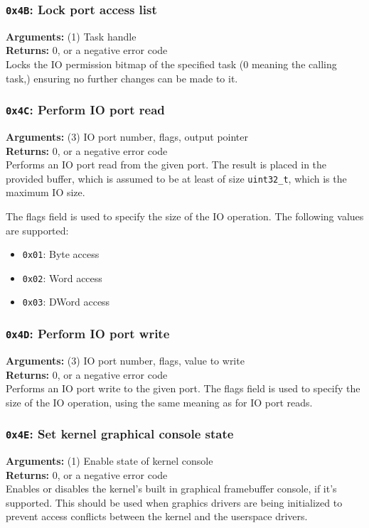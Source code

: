 \documentclass[11pt]{article}
\begin{document}
\subsubsection{{\tt 0x4B}: Lock port access list}
\textbf{Arguments:} (1) Task handle \\
\textbf{Returns:} 0, or a negative error code \\

Locks the IO permission bitmap of the specified task (0 meaning the calling task,) ensuring no further changes can be made to it.

\subsubsection{{\tt 0x4C}: Perform IO port read}
\textbf{Arguments:} (3) IO port number, flags, output pointer \\
\textbf{Returns:} 0, or a negative error code \\

Performs an IO port read from the given port. The result is placed in the provided buffer, which is assumed to be at least of size \texttt{uint32\_t}, which is the maximum IO size.

The flags field is used to specify the size of the IO operation. The following values are supported:
\begin{itemize}
\item \texttt{0x01}: Byte access
\item \texttt{0x02}: Word access
\item \texttt{0x03}: DWord access
\end{itemize}

\subsubsection{{\tt 0x4D}: Perform IO port write}
\textbf{Arguments:} (3) IO port number, flags, value to write \\
\textbf{Returns:} 0, or a negative error code \\

Performs an IO port write to the given port. The flags field is used to specify the size of the IO operation, using the same meaning as for IO port reads.

\subsubsection{{\tt 0x4E}: Set kernel graphical console state}
\textbf{Arguments:} (1) Enable state of kernel console \\
\textbf{Returns:} 0, or a negative error code \\

Enables or disables the kernel's built in graphical framebuffer console, if it's supported. This should be used when graphics drivers are being initialized to prevent access conflicts between the kernel and the userspace drivers.
\end{document}
